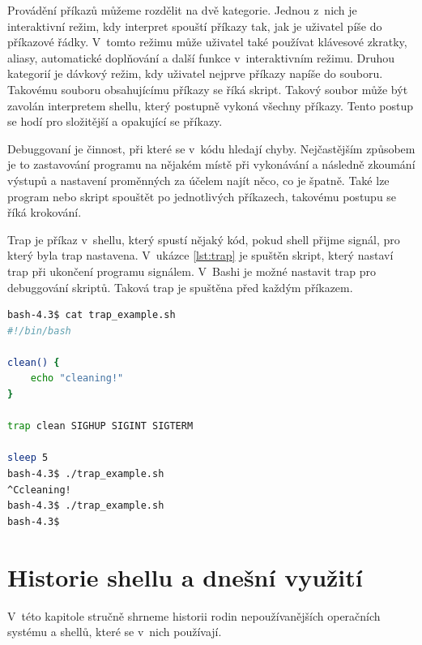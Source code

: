 \documentclass[thesis=M,czech]{FITthesis}[2012/06/26]
\begin{document}
Provádění příkazů můžeme rozdělit na dvě kategorie. Jednou z~nich je interaktivní režim, kdy interpret spouští příkazy tak, jak je uživatel píše do příkazové řádky. V~tomto režimu může uživatel také používat klávesové zkratky, aliasy, automatické doplňování a další funkce v~interaktivním režimu. Druhou kategorií je dávkový režim, kdy uživatel nejprve příkazy napíše do souboru. Takovému souboru obsahujícímu příkazy se říká skript. Takový soubor může být zavolán interpretem shellu, který postupně vykoná všechny příkazy. Tento postup se hodí pro složitější a opakující se příkazy.


Debuggovaní je činnost, při které se v~kódu hledají chyby. Nejčastějším způsobem je to zastavování programu na nějakém místě při vykonávání a následně zkoumání výstupů a nastavení proměnných za účelem najít něco, co je špatně. Také lze program nebo skript spouštět po jednotlivých příkazech, takovému postupu se říká krokování.


Trap je příkaz v~shellu, který spustí nějaký kód, pokud shell přijme signál, pro který byla trap nastavena. V~ukázce \ref{lst:trap} je spuštěn skript, který nastaví trap při ukončení programu signálem. V~Bashi je možné nastavit trap pro debuggování skriptů. Taková trap je spuštěna před každým příkazem.

\noindent
\begin{minipage}{\linewidth}
\begin{lstlisting}[language=bash, caption={Ukázka trap v~shellu Bash}, label={lst:trap}]
bash-4.3$ cat trap_example.sh
#!/bin/bash

clean() {
	echo "cleaning!"
}

trap clean SIGHUP SIGINT SIGTERM

sleep 5
bash-4.3$ ./trap_example.sh
^Ccleaning!
bash-4.3$ ./trap_example.sh
bash-4.3$
\end{lstlisting}
\end{minipage}

%
\chapter{Historie shellu a dnešní využití}

V~této kapitole stručně shrneme historii rodin nepoužívanějších operačních systému a shellů, které se v~nich používají.

\end{document}
